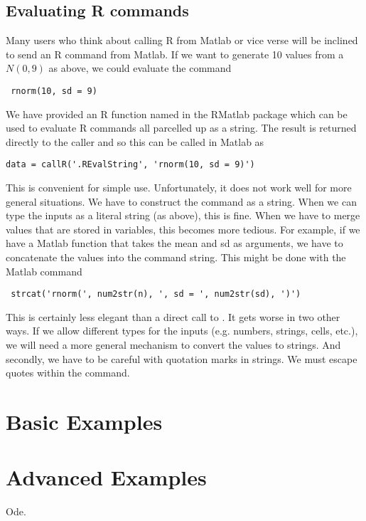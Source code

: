 \documentclass{article}
\begin{document}
\subsection{Evaluating R commands}
Many users who think about calling R from Matlab or vice verse will be
inclined to send an R command from Matlab.  If we want to generate 10
values from a $N(0, 9)$ as above, we could evaluate the command
\begin{verbatim}
 rnorm(10, sd = 9) 
\end{verbatim}
We have provided an R function named
 in the RMatlab package
which can be used to evaluate R commands all parcelled up
as a string.
The result is returned directly to the  caller
and so this can be called in Matlab as 
\begin{verbatim}
data = callR('.REvalString', 'rnorm(10, sd = 9)')
\end{verbatim}

This is convenient for simple use.  Unfortunately, it does not work
well for more general situations.  We have to construct the
command as a string. When we can type the inputs as a literal
string (as above), this is fine. 
When we have to merge values that are stored in variables, this
becomes
more tedious.  For example, if we have a Matlab function
that takes the mean and sd as arguments, we have to
concatenate the values into the command string.
This might be done with the Matlab command
\begin{verbatim}
 strcat('rnorm(', num2str(n), ', sd = ', num2str(sd), ')')
\end{verbatim}
This is certainly less elegant than a direct call to
.
It gets worse in two other ways.
If we allow different types for the inputs
(e.g. numbers, strings, cells, etc.), we will need a more general
mechanism to convert the values to strings.
And secondly, we have to be careful with quotation marks in strings.
We must escape quotes within the command.



\section{Basic Examples}




\section{Advanced Examples}
Ode.
\end{document}
